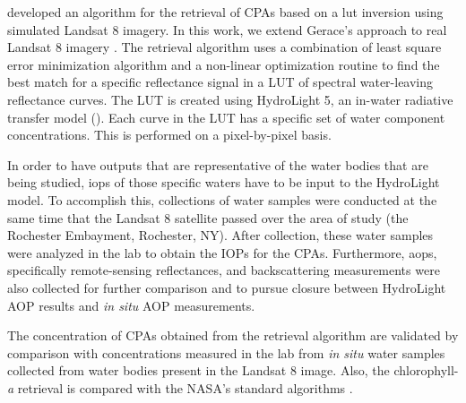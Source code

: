 \citet{Gerace:2013} developed an algorithm for the retrieval of CPAs based on a \acrfull{lut} inversion using simulated Landsat 8 imagery. In this work, we extend Gerace's approach to real Landsat 8 imagery \citep{Concha2013IGARSS}. The retrieval algorithm uses a combination of least square error minimization algorithm and a non-linear optimization routine to find the best match for a specific reflectance signal in a LUT of spectral water-leaving reflectance curves. The LUT is created using HydroLight 5, an in-water radiative transfer model (\citep{Mobley:2005}). Each curve in the LUT has a specific set of water component concentrations. This is performed on a pixel-by-pixel basis. 

In order to have outputs that are representative of the water bodies that are being studied, \acrfull{iops} of those specific waters have to be input to the HydroLight model. To accomplish this, collections of water samples were conducted at the same time that the Landsat 8 satellite passed over the area of study (the Rochester Embayment, Rochester, NY). After collection, these water samples were analyzed in the lab to obtain the IOPs for the CPAs. Furthermore, \acrfull{aops}, specifically remote-sensing reflectances, and backscattering measurements were also collected for further comparison and to pursue closure between HydroLight AOP results and {\it in situ} AOP measurements.

The concentration of CPAs obtained from the retrieval algorithm are validated by comparison with concentrations measured in the lab from {\it in situ} water samples collected from water bodies present in the Landsat 8 image. Also, the chlorophyll-{\it a} retrieval is compared with the NASA's standard algorithms \citep{OReilly1998_Chl,OReilly2000,Hu:2012fv}.